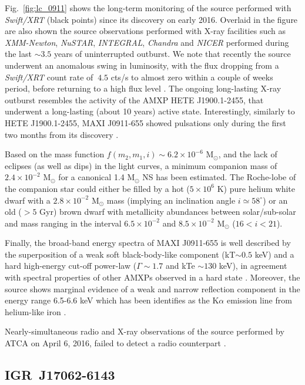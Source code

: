 \documentclass[graybox]{svmult}
\def \inte {{\em INTEGRAL\xspace}}
\def \chandra {{\em Chandra\xspace}}
\def \xmm {{\em XMM-Newton\xspace}}
\def \swiftxrt{{\em Swift/XRT\xspace}}
\def \nustar{{\em NuSTAR\xspace}}
\def \nicer{{\em NICER\xspace}}
\begin{document}
Fig.~\ref{fig:lc_0911} shows the long-term monitoring of the source performed with \swiftxrt{} (black points) since its discovery on early 2016. Overlaid in the figure are also shown the source observations performed with X-ray facilities such as \xmm{}, \nustar{}, \inte{}, \chandra{} and \nicer{} performed during the last $\sim3.5$ years of uninterrupted outburst. We note that recently the source underwent an anomalous swing in luminosity, with the flux dropping from a \swiftxrt{} count rate of $~4.5$ cts/s to almost zero within a couple of weeks period, before returning to a high flux level \cite{Bult2019b}. The ongoing long-lasting X-ray outburst resembles the activity of the AMXP HETE J1900.1-2455, that underwent a long-lasting (about 10 years) active state. 
Interestingly, similarly to HETE J1900.1-2455, MAXI J0911-655 showed pulsations only during the first two months from its discovery \cite{Sanna2017a}.

Based on the mass function $f(m_2, m_1, i) \sim 6.2\times10^{-6}$ M$_\odot$, and the lack of eclipses (as well as dips) in the light curves, a minimum companion mass of $2.4\times 10^{-2}$ M$_\odot$ for a canonical 1.4 M$_\odot$ NS has been estimated. The Roche-lobe of the companion star could either be filled by a hot ($5\times10^{6}$ K) pure helium white dwarf with a $2.8\times 10^{-2}$ M$_\odot$ mass (implying an inclination angle $i\simeq 58^\circ$) or an old ($>5$ Gyr) brown dwarf with metallicity abundances between solar/sub-solar and mass ranging in the interval $6.5\times 10^{-2}$ and $8.5\times 10^{-2}$ M$_\odot$ ($16 < i < 21$). 

Finally, the broad-band energy spectra of MAXI J0911-655 is well described by the superposition of a weak soft black-body-like component (kT$\sim0.5$ keV) and a hard high-energy cut-off power-law ($\Gamma \sim 1.7$ and kTe $\sim130$ keV), in agreement with spectral properties of other AMXPs observed in a hard state \cite{Falanga2005a,Falanga2005b,Gierlinski2005,Patruno2009, Papitto2009,Papitto2009,Papitto2013a}. Moreover, the source shows marginal evidence of a weak and narrow reflection component in the energy range 6.5-6.6 keV which has been identifies as the K$\alpha$ emission line from helium-like iron \cite{Sanna2017a}.

Nearly-simultaneous radio and X-ray observations of the source performed by ATCA on April 6, 2016, failed to detect a radio counterpart \cite{Tudor2016}.


\subsection{IGR~J17062-6143}
\end{document}
